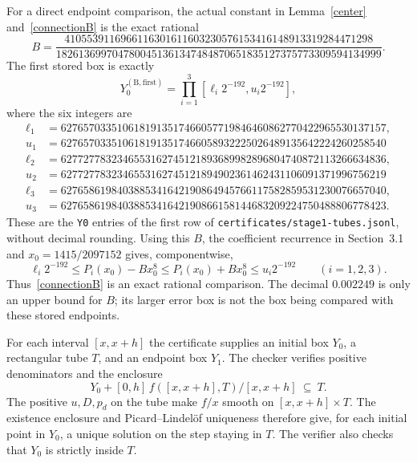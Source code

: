\documentclass[11pt]{article}
\begin{document}
For a direct endpoint comparison, the actual constant in
Lemma~\ref{center} and~\eqref{connectionB} is the exact rational
\[
 B=\frac{4105539116966116301611603230576153416148913319284471298}{1826136997047800451361347484870651835127375773309594134999}.
\]
The first stored box is exactly
\[
 Y_0^{(\mathrm B,\mathrm{first})}
 =\prod_{i=1}^3[\ell_i2^{-192},u_i2^{-192}],
\]
where the six integers are
\[
\begin{aligned}
 \ell_1&=6276570335106181913517466057719846460862770422965530137157,\\
 u_1&=6276570335106181913517466058932225026489135642224260258540\\
 \ell_2&=6277277832346553162745121893689982896804740872113266634836,\\
 u_2&=6277277832346553162745121894902361462431106091371996756219\\
 \ell_3&=6276586198403885341642190864945766117582859531230076657040,\\
 u_3&=6276586198403885341642190866158144683209224750488806778423.
\end{aligned}
\]
These are the \texttt{Y0} entries of the first row of
\texttt{certificates/stage1-tubes.jsonl}, without decimal rounding.
Using this $B$, the coefficient recurrence in Section~3.1 and
$x_0=1415/2097152$ gives, componentwise,
\[
 \ell_i2^{-192}\leq P_i(x_0)-Bx_0^8
 \leq P_i(x_0)+Bx_0^8\leq u_i2^{-192}\qquad(i=1,2,3).
\]
Thus~\eqref{connectionB} is an exact rational comparison.
The decimal $0.002249$ is only an upper bound for $B$; its larger
error box is not the box being compared with these stored endpoints.

For each interval $[x,x+h]$ the certificate supplies an initial box $Y_0$, a rectangular tube $T$, and an endpoint box $Y_1$. The checker verifies positive denominators and the enclosure
\[
 Y_0+[0,h]\,f([x,x+h],T)/[x,x+h]\ \subseteq\ T.
\]
The positive $u,D,p_d$ on the tube make $f/x$ smooth on $[x,x+h]\times T$. The existence enclosure and Picard--Lindel\"of uniqueness therefore give, for each initial point in $Y_0$, a unique solution on the step staying in $T$. The verifier also checks that $Y_0$ is strictly inside $T$.
\end{document}
